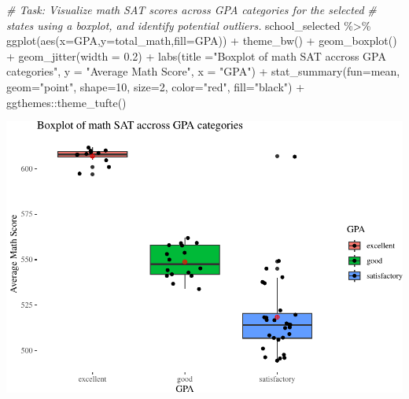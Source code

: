 \documentclass[
]{book}
\newenvironment{Shaded}{\begin{snugshade}}{\end{snugshade}}
\newcommand{\AttributeTok}[1]{\textcolor[rgb]{0.77,0.63,0.00}{#1}}
\newcommand{\CommentTok}[1]{\textcolor[rgb]{0.56,0.35,0.01}{\textit{#1}}}
\newcommand{\DecValTok}[1]{\textcolor[rgb]{0.00,0.00,0.81}{#1}}
\newcommand{\FloatTok}[1]{\textcolor[rgb]{0.00,0.00,0.81}{#1}}
\newcommand{\FunctionTok}[1]{\textcolor[rgb]{0.00,0.00,0.00}{#1}}
\newcommand{\NormalTok}[1]{#1}
\newcommand{\SpecialCharTok}[1]{\textcolor[rgb]{0.00,0.00,0.00}{#1}}
\newcommand{\StringTok}[1]{\textcolor[rgb]{0.31,0.60,0.02}{#1}}
\begin{document}
\begin{Shaded}
\begin{Highlighting}[]
\CommentTok{\# Task: Visualize math SAT scores across GPA categories for the selected}
\CommentTok{\# states using a boxplot, and identify potential outliers.}
\NormalTok{school\_selected }\SpecialCharTok{\%\textgreater{}\%}
  \FunctionTok{ggplot}\NormalTok{(}\FunctionTok{aes}\NormalTok{(}\AttributeTok{x=}\NormalTok{GPA,}\AttributeTok{y=}\NormalTok{total\_math,}\AttributeTok{fill=}\NormalTok{GPA)) }\SpecialCharTok{+}
  \FunctionTok{theme\_bw}\NormalTok{() }\SpecialCharTok{+}
  \FunctionTok{geom\_boxplot}\NormalTok{() }\SpecialCharTok{+}
  \FunctionTok{geom\_jitter}\NormalTok{(}\AttributeTok{width =} \FloatTok{0.2}\NormalTok{) }\SpecialCharTok{+}
  \FunctionTok{labs}\NormalTok{(}\AttributeTok{title =}\StringTok{"Boxplot of math SAT accross GPA categories"}\NormalTok{,}
       \AttributeTok{y =} \StringTok{"Average Math Score"}\NormalTok{,}
       \AttributeTok{x =} \StringTok{"GPA"}\NormalTok{) }\SpecialCharTok{+}
  \FunctionTok{stat\_summary}\NormalTok{(}\AttributeTok{fun=}\NormalTok{mean, }\AttributeTok{geom=}\StringTok{"point"}\NormalTok{, }\AttributeTok{shape=}\DecValTok{10}\NormalTok{,}
               \AttributeTok{size=}\DecValTok{2}\NormalTok{, }\AttributeTok{color=}\StringTok{"red"}\NormalTok{, }\AttributeTok{fill=}\StringTok{"black"}\NormalTok{) }\SpecialCharTok{+}
\NormalTok{  ggthemes}\SpecialCharTok{::}\FunctionTok{theme\_tufte}\NormalTok{()}
\end{Highlighting}
\end{Shaded}

\includegraphics[width=1\linewidth]{Class_Activity_25_files/figure-latex/unnamed-chunk-14-1}
\end{document}
